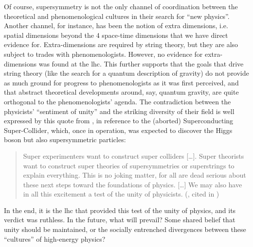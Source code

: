 \documentclass[smallextended]{svjour3}
\begin{document}
Of course, supersymmetry is not the only channel of coordination between the theoretical and phenomenological cultures in their search for ``new physics''. Another channel, for instance, has been the notion of extra dimensions, i.e. spatial dimensions beyond the 4 space-time dimensions that we have direct evidence for. Extra-dimensions are required by string theory, but they are also subject to trades with phenomenologists. However, no evidence for extra-dimensions was found at the \gls{lhc}. This further supports that the goals that drive string theory (like the search for a quantum description of gravity) do not provide as much ground for progress to phenomenologists as it was first perceived, and that abstract theoretical developments around, say, quantum gravity, are quite orthogonal to the phenomenologists' agenda. The contradiction between the physicists' ``sentiment of unity'' and the striking diversity of their field is well expressed by this quote from \citet{Wilson1986}, in reference to the (aborted) 
 Superconducting Super-Collider, which, once in operation, was expected to discover the Higgs boson but also supersymmetric particles:

\begin{quote}
    Super experimenters want to construct super colliders [\dots]. Super theorists want to construct super theories of supersymmetries or superstrings to explain everything. This is no joking matter, for all are dead serious about these next steps toward the foundations of physics. [\dots] We may also have in all this excitement a test of the unity of physicists. (\citealt[p.~29]{Wilson1986}, cited in \citealt[p.~292]{Cat1998})
\end{quote}

In the end, it is the \gls{lhc} that provided this test of the unity of physics, and its verdict was ruthless. In the future, what will prevail? Some shared belief that unity should be maintained, or the socially entrenched divergences between these ``cultures'' of high-energy physics? 
\end{document}
